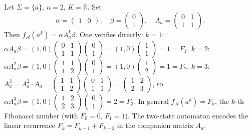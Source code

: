 \begin{example}\label{ex:fibonacci-wfa}
Let $\Sigma = \{a\}$, $n = 2$, $K = \mathbb{R}$. Set
\[
  \alpha = \begin{pmatrix} 1 & 0 \end{pmatrix}, \quad
  \beta = \begin{pmatrix} 0 \\ 1 \end{pmatrix}, \quad
  A_a = \begin{pmatrix} 0 & 1 \\ 1 & 1 \end{pmatrix}.
\]
Then $f_\mathcal{A}(a^k) = \alpha A_a^k \beta$. One verifies directly:
$k=1$: $\alpha A_a \beta = (1,0)\begin{pmatrix}0&1\\1&1\end{pmatrix}\begin{pmatrix}0\\1\end{pmatrix} = (1,0)\begin{pmatrix}1\\1\end{pmatrix} = 1 = F_1$.
$k=2$: $\alpha A_a^2 \beta = (1,0)\begin{pmatrix}1&1\\1&2\end{pmatrix}\begin{pmatrix}0\\1\end{pmatrix} = (1,0)\begin{pmatrix}1\\2\end{pmatrix} = 1 = F_2$.
$k=3$: $A_a^3 = A_a^2 \cdot A_a = \begin{pmatrix}1&1\\1&2\end{pmatrix}\begin{pmatrix}0&1\\1&1\end{pmatrix} = \begin{pmatrix}1&2\\2&3\end{pmatrix}$, so $\alpha A_a^3 \beta = (1,0)\begin{pmatrix}1&2\\2&3\end{pmatrix}\begin{pmatrix}0\\1\end{pmatrix} = 2 = F_3$.
In general $f_\mathcal{A}(a^k) = F_k$, the $k$-th Fibonacci number (with $F_0 = 0$, $F_1 = 1$). The two-state automaton encodes the linear recurrence $F_k = F_{k-1} + F_{k-2}$ in the companion matrix $A_a$.
\end{example}

